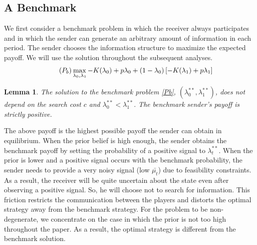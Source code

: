 \documentclass[11pt]{extarticle}
\newtheorem{lemma}{Lemma}
\begin{document}
\subsection{A Benchmark}
We first consider a benchmark problem in which the receiver always participates and in which the sender can generate an arbitrary amount of information in each period. The sender chooses the information structure to maximize the expected payoff. We will use the solution throughout the subsequent analyses.
\begin{align}\tag{$P_{b}$} \label{Pb} \max\limits_{\lambda_0, \lambda_1} -K(\lambda_0) + p \lambda_0 + (1-\lambda_0) \left[-K(\lambda_1)+p \lambda_1\right] \nonumber
\end{align}

\begin{lemma}\label{unconstrained}
	The solution to the benchmark problem \eqref{Pb}, $(\lambda_0^{**}, \lambda_1^{**})$, does not depend on the search cost $c$ and $\lambda_0^{**} < \lambda_1^{**}$. The benchmark sender's payoff is strictly positive. 
\end{lemma}

The above payoff is the highest possible payoff the sender can obtain in equilibrium. When the prior belief is high enough, the sender obtains the benchmark payoff by setting the probability of a positive signal to $\lambda_t^{**}$. When the prior is lower and a positive signal occurs with the benchmark probability, the sender needs to provide a very noisy signal (low $\bar{\mu_t}$) due to feasibility constraints. As a result, the receiver will be quite uncertain about the state even after observing a positive signal. So, he will choose not to search for information. This friction restricts the communication between the players and distorts the optimal strategy away from the benchmark strategy. For the problem to be non-degenerate, we concentrate on the case in which the prior is not too high throughout the paper. As a result, the optimal strategy is different from the benchmark solution.
\end{document}
